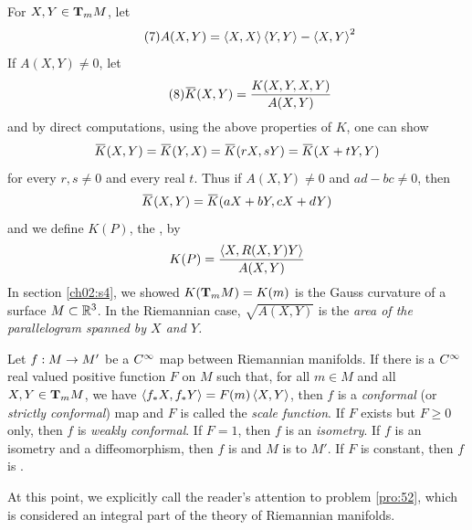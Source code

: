 \documentclass[../main]{subfiles}
\begin{document}
For $X,Y\in\tangentspace{M}{m}$, let
\begin{equation}\tag{7} \label{eqn:ch6.2.5}
    A(X,Y) = \ip{X}{X}\ip{Y}{Y}-\ip{X}{Y}^2
\end{equation}
If $A(X,Y)\ne0$, let
\begin{equation}\tag{8} \label{eqn:ch6.2.6}
    \xoverline K(X,Y) = \frac{K(X,Y,X,Y)}{A(X,Y)}
\end{equation}
and by direct computations, using the above properties of $K$, one can show
\[\xoverline K(X,Y) = \xoverline K(Y,X) = \xoverline K(rX,sY) = \xoverline K(X+tY,Y)\]
for every $r,s\ne0$ and every real $t$. Thus if $A(X,Y)\ne0$ and $ad-bc\ne0$, then
\[\xoverline K(X,Y) = \xoverline K(aX+bY,cX+dY)\]
and we define $K(P)$, the , by
\[K(P) = \frac{\ip{X}{R(X,Y)Y}}{A(X,Y)}\]
In section \ref{ch02:s4}, we showed $K(\tangentspace{M}{m})=K(m)$ is the Gauss curvature of a surface $M\subset\bR^3$. In the Riemannian case, $\sqrt{A(X,Y)}$ is the \emph{area of the parallelogram spanned by $X$ and $Y$.}

Let $f:M\functionMaps M'$ be a $\CInfty$ map between Riemannian manifolds. If there is a $\CInfty$ real valued positive function $F$ on $M$ such that, for all $m\in M$ and all $X,Y\in\tangentspace{M}{m}$, we have $\ip{f_*X}{f_*Y}=F(m)\ip{X}{Y}$, then $f$ is a \emph{conformal} (or \emph{strictly conformal}) map and $F$ is called the \emph{scale function}. If $F$ exists but $F\ge0$ only, then $f$ is \emph{weakly conformal}. If $F=1$, then $f$ is an \emph{isometry}. If $f$ is an isometry and a diffeomorphism, then $f$ is  and $M$ is  to $M'$. If $F$ is constant, then $f$ is .

At this point, we explicitly call the reader's attention to problem \ref{pro:52}, which is considered an integral part of the theory of Riemannian manifolds.
\end{document}
